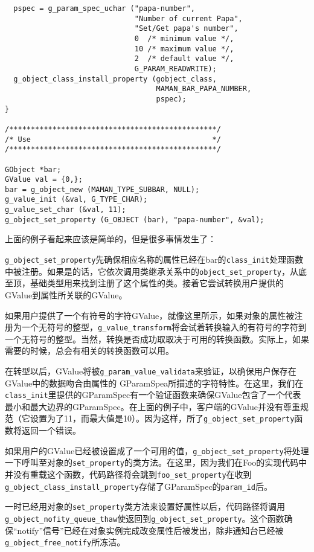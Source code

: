 \begin{verbatim}
  pspec = g_param_spec_uchar ("papa-number",
                              "Number of current Papa",
                              "Set/Get papa's number",
                              0  /* minimum value */,
                              10 /* maximum value */,
                              2  /* default value */,
                              G_PARAM_READWRITE);
  g_object_class_install_property (gobject_class,
                                   MAMAN_BAR_PAPA_NUMBER,
                                   pspec);
}

/************************************************/
/* Use                                          */
/************************************************/

GObject *bar;
GValue val = {0,};
bar = g_object_new (MAMAN_TYPE_SUBBAR, NULL);
g_value_init (&val, G_TYPE_CHAR);
g_value_set_char (&val, 11);
g_object_set_property (G_OBJECT (bar), "papa-number", &val);
\end{verbatim}

上面的例子看起来应该是简单的，但是很多事情发生了：

\verb|g_object_set_property|先确保相应名称的属性已经在bar的\verb|class_init|处理函数中被注册。如果是的话，它依次调用类继承关系中的\verb|object_set_property|，从底至顶，基础类型用来找到注册了这个属性的类。接着它尝试转换用户提供的GValue到属性所关联的GValue。

如果用户提供了一个有符号的字符GValue，就像这里所示，如果对象的属性被注册为一个无符号的整型，\verb|g_value_transform|将会试着转换输入的有符号的字符到一个无符号的整型。当然，转换是否成功取取决于可用的转换函数。实际上，如果需要的时候，总会有相关的转换函数可以用。

在转型以后，GValue将被\verb|g_param_value_validata|来验证，以确保用户保存在GValue中的数据吻合由属性的 GParamSpea所描述的字符特性。在这里，我们在\verb|class_init|里提供的GParamSpec有一个验证函数来确保GValue包含了一个代表最小和最大边界的GParamSpec。在上面的例子中，客户端的GValue并没有尊重规范（它设置为了11，而最大值是10）。因为这样，所了\verb|g_object_set_property|函数将返回一个错误。

如果用户的GValue已经被设置成了一个可用的值，\verb|g_object_set_property|将处理一下呼叫至对象的\verb|set_property|的类方法。在这里，因为我们在Foo的实现代码中并没有重载这个函数，代码路径将会跳到\verb|foo_set_property|在收到\verb|g_object_class_install_property|存储了GParamSpec的\verb|param_id|后。

一时已经用对象的\verb|set_property|类方法来设置好属性以后，代码路径将调用\verb|g_object_nofity_queue_thaw|使返回到\verb|g_object_set_property|。这个函数确保“notify”信号”已经在对象实例完成改变属性后被发出，除非通知台已经被\verb|g_object_free_notify|所冻洁。

